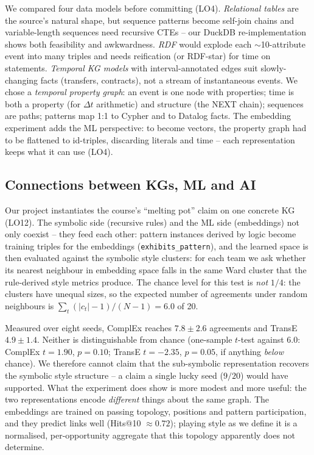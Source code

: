 \documentclass[11pt,a4paper]{article}
\begin{document}
We compared four data models before committing (LO4). \emph{Relational tables}
are the source's natural shape, but sequence patterns become self-join chains
and variable-length sequences need recursive CTEs -- our DuckDB re-implementation
shows both feasibility and awkwardness. \emph{RDF} would explode each
$\sim$10-attribute event into many triples and needs reification (or RDF-star)
for time on statements. \emph{Temporal KG models} with interval-annotated edges
suit slowly-changing facts (transfers, contracts), not a stream of instantaneous
events. We chose a \emph{temporal property graph}: an event is one node with
properties; time is both a property (for $\Delta t$ arithmetic) and structure
(the NEXT chain); sequences are paths; patterns map 1:1 to Cypher and to Datalog
facts. The embedding experiment adds the ML perspective: to become vectors, the
property graph had to be flattened to id-triples, discarding literals and time
-- each representation keeps what it can use (LO4).

\subsection{Connections between KGs, ML and AI}
\label{sec:connections}

Our project instantiates the course's ``melting pot'' claim on one concrete KG
(LO12). The symbolic side (recursive rules) and the ML side (embeddings) not
only coexist -- they feed each other: pattern instances derived by logic become
training triples for the embeddings (\texttt{exhibits\_pattern}), and the
learned space is then evaluated against the symbolic style clusters: for each
team we ask whether its nearest neighbour in embedding space falls in the same
Ward cluster that the rule-derived style metrics produce. The chance level for
this test is \emph{not} $1/4$: the clusters have unequal sizes, so the expected
number of agreements under random neighbours is
$\sum_t (|c_t| - 1)/(N-1) = 6.0$ of 20.

Measured over eight seeds, ComplEx reaches $7.8 \pm 2.6$ agreements and TransE
$4.9 \pm 1.4$. Neither is distinguishable from chance (one-sample $t$-test
against $6.0$: ComplEx $t = 1.90$, $p = 0.10$; TransE $t = -2.35$, $p = 0.05$,
if anything \emph{below} chance). We therefore cannot claim that the
sub-symbolic representation recovers the symbolic style structure -- a claim a
single lucky seed ($9/20$) would have supported. What the experiment does show
is more modest and more useful: the two representations encode \emph{different}
things about the same graph. The embeddings are trained on passing topology,
positions and pattern participation, and they predict links well
(Hits@10 $\approx 0.72$); playing style as we define it is a normalised,
per-opportunity aggregate that this topology apparently does not determine.
\end{document}
